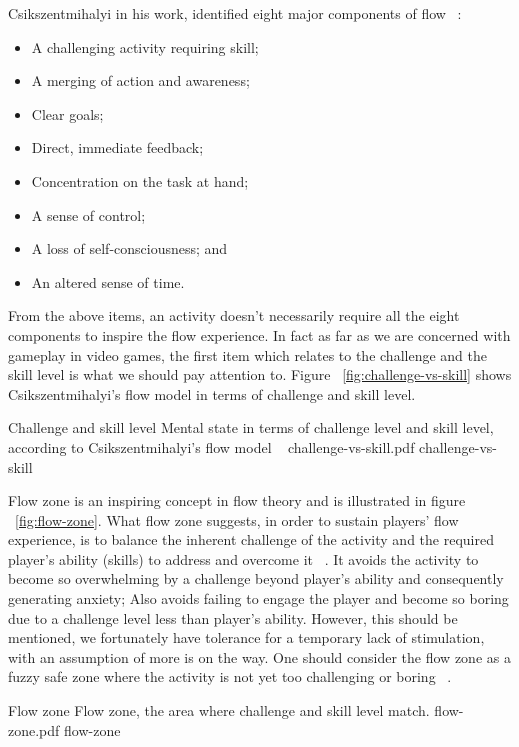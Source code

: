 Csikszentmihalyi in his work, identified eight major components of flow ~\cite{csikszentmihalyi1990flow}:

\begin{itemize}
\item A challenging activity requiring skill;
\item A merging of action and awareness;
\item Clear goals;
\item Direct, immediate feedback;
\item Concentration on the task at hand; 
\item A sense of control;
\item A loss of self-consciousness; and
\item An altered sense of time. 
\end{itemize}

From the above items, an activity doesn't necessarily require all the eight components to inspire the flow experience. In fact as far as we are concerned with gameplay in video games, the first item which relates to the challenge and the skill level is what we should pay attention to. Figure ~\ref{fig:challenge-vs-skill} shows Csikszentmihalyi's flow model in terms of challenge and skill level.

\img
{Challenge and skill level}
{Mental state in terms of challenge level and skill level, according to Csikszentmihalyi's flow model ~\cite{csikszentmihalyi1997finding}}
{challenge-vs-skill.pdf}
{challenge-vs-skill}

Flow zone is an inspiring concept in flow theory and is illustrated in figure ~\ref{fig:flow-zone}. What flow zone suggests, in order to sustain players' flow experience, is to balance the inherent challenge of the activity and the required player's ability (skills) to address and overcome it ~\cite{chen2007flow}. It avoids the activity to become so overwhelming by a challenge beyond player's ability and consequently generating anxiety; Also avoids failing to engage the player and become so boring due to a challenge level less than player's ability. However, this should be mentioned, we fortunately have tolerance for a temporary lack of stimulation, with an assumption of more is on the way. One should consider the flow zone as a fuzzy safe zone where the activity is not yet too challenging or boring ~\cite{csikszentmihalyi1990flow}.

\img
{Flow zone}
{Flow zone, the area where challenge and skill level match.}
{flow-zone.pdf}
{flow-zone}

